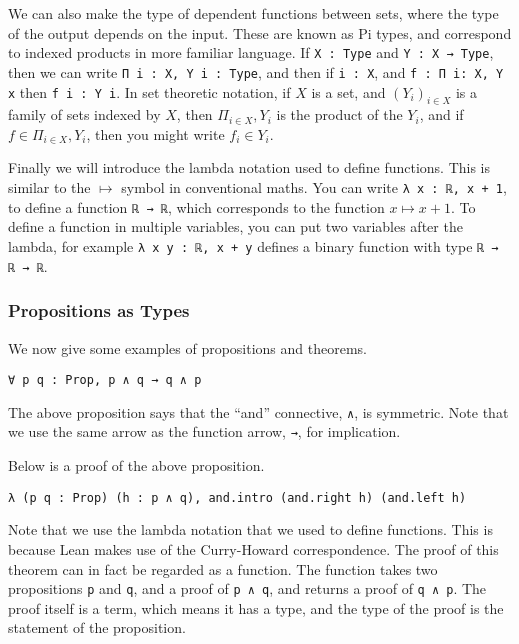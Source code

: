 \documentclass[12pt]{article} %
\theoremstyle{definition}
\theoremstyle{definition}
\theoremstyle{definition}
\theoremstyle{definition}
\begin{document}
We can also make the type of dependent functions between sets,
where the type of the output depends on the input. These are known as Pi types, and correspond
to indexed products in more familiar language.
If \lstinline{X : Type} and \lstinline{Y : X → Type}, then we can write
\lstinline{Π i : X, Y i : Type}, and then if \lstinline{i : X},
and \lstinline{f : Π i: X, Y x} then \lstinline{f i : Y i}.
In set theoretic notation, if $X$ is a set,
and $(Y_i)_{i \in X}$ is a family of sets indexed by $X$, then
$\Pi_{i \in X}, Y_i$ is the product of the $Y_i$, and if
$f \in \Pi_{i \in X}, Y_i$, then you might write $f_i \in Y_i$.

Finally we will introduce the lambda notation used to define functions. This
is similar to the $\mapsto$ symbol in conventional maths. You can write
\lstinline{λ x : ℝ, x + 1}, to define a function \lstinline{ℝ → ℝ},
which corresponds to the function $x \mapsto x + 1$. To define a function
in multiple variables, you can put two variables after the lambda, for example
\lstinline{λ x y : ℝ, x + y} defines a binary function with type \lstinline{ℝ → ℝ → ℝ}.

\subsubsection{Propositions as Types}

We now give some examples of propositions and theorems.

\begin{lstlisting}
∀ p q : Prop, p ∧ q → q ∧ p
\end{lstlisting}

The above proposition says that the ``and'' connective, \lstinline{∧}, is symmetric. Note that
we use the same arrow as the function arrow, \lstinline{→}, for implication.

Below is a proof of the above proposition.
\begin{lstlisting}
λ (p q : Prop) (h : p ∧ q), and.intro (and.right h) (and.left h)
\end{lstlisting}

Note that we use the lambda notation that we used to define functions. This is because Lean
makes use of the Curry-Howard correspondence. The proof of this theorem can in fact be
regarded as a function. The function takes two propositions \lstinline{p} and \lstinline{q},
and a proof of \lstinline{p ∧ q}, and returns a proof of \lstinline{q ∧ p}. The proof itself
is a term, which means it has a type, and the type of the proof is the statement of the proposition.
\end{document}
